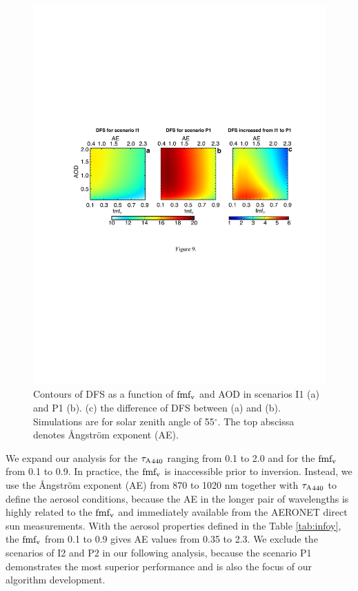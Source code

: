 \begin{figure}[t]
  \centering
  \includegraphics[width={\textwidth}]{figures/info09.pdf}
  \caption{Contours of DFS as a function of $\text{fmf}_\text{v}$ and AOD in scenarios
I1 (a) and P1 (b). (c) the difference of DFS between (a) and (b).
Simulations are for solar zenith angle of 55$^\circ$. The top abscissa denotes
Ångström exponent (AE).}
  \label{fig:infodfs2}
\end{figure}

We expand our analysis for the ${\tau_\text{A}}_{440}$ ranging from 0.1 to 2.0 
and for the $\text{fmf}_\text{v}$ from 0.1 to 0.9. In practice, the $\text{fmf}_\text{v}$ is 
inaccessible prior to inversion. Instead, we use the 
Ångström exponent (AE) from 870 to 1020 nm together with
${\tau_\text{A}}_{440}$ to define the aerosol conditions, because the AE
in the longer pair of wavelengths is highly related to the $\text{fmf}_\text{v}$
\citep{Schuster06} and immediately available from the AERONET direct sun 
measurements. With the aerosol properties defined in the Table
\ref{tab:infoy}, the $\text{fmf}_\text{v}$ from 0.1 to 0.9 gives AE values from
0.35 to 2.3. We exclude the scenarios of I2 and P2 in our following
analysis, because the scenario P1 demonstrates the most superior
performance and is also the focus of our algorithm development.

